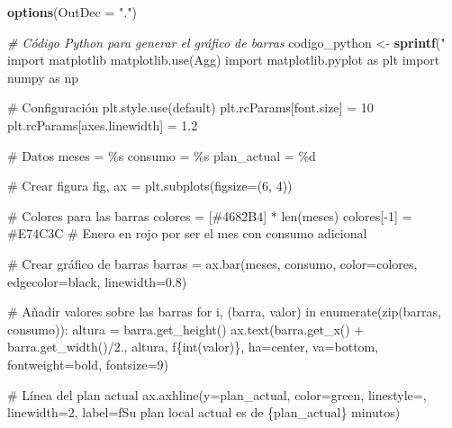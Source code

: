 \documentclass[
]{article}
\newenvironment{Shaded}{\begin{snugshade}}{\end{snugshade}}
\newcommand{\AttributeTok}[1]{\textcolor[rgb]{0.13,0.29,0.53}{#1}}
\newcommand{\CommentTok}[1]{\textcolor[rgb]{0.56,0.35,0.01}{\textit{#1}}}
\newcommand{\FunctionTok}[1]{\textcolor[rgb]{0.13,0.29,0.53}{\textbf{#1}}}
\newcommand{\NormalTok}[1]{#1}
\newcommand{\OtherTok}[1]{\textcolor[rgb]{0.56,0.35,0.01}{#1}}
\newcommand{\StringTok}[1]{\textcolor[rgb]{0.31,0.60,0.02}{#1}}
\begin{document}
\begin{Shaded}
\begin{Highlighting}[]
\FunctionTok{options}\NormalTok{(}\AttributeTok{OutDec =} \StringTok{"."}\NormalTok{)}

\CommentTok{\# Código Python para generar el gráfico de barras}
\NormalTok{codigo\_python }\OtherTok{\textless{}{-}} \FunctionTok{sprintf}\NormalTok{(}\StringTok{"}
\StringTok{import matplotlib}
\StringTok{matplotlib.use(\textquotesingle{}Agg\textquotesingle{})}
\StringTok{import matplotlib.pyplot as plt}
\StringTok{import numpy as np}

\StringTok{\# Configuración}
\StringTok{plt.style.use(\textquotesingle{}default\textquotesingle{})}
\StringTok{plt.rcParams[\textquotesingle{}font.size\textquotesingle{}] = 10}
\StringTok{plt.rcParams[\textquotesingle{}axes.linewidth\textquotesingle{}] = 1.2}

\StringTok{\# Datos}
\StringTok{meses = \%s}
\StringTok{consumo = \%s}
\StringTok{plan\_actual = \%d}

\StringTok{\# Crear figura}
\StringTok{fig, ax = plt.subplots(figsize=(6, 4))}

\StringTok{\# Colores para las barras}
\StringTok{colores = [\textquotesingle{}\#4682B4\textquotesingle{}] * len(meses)}
\StringTok{colores[{-}1] = \textquotesingle{}\#E74C3C\textquotesingle{}  \# Enero en rojo por ser el mes con consumo adicional}

\StringTok{\# Crear gráfico de barras}
\StringTok{barras = ax.bar(meses, consumo, color=colores, edgecolor=\textquotesingle{}black\textquotesingle{}, linewidth=0.8)}

\StringTok{\# Añadir valores sobre las barras}
\StringTok{for i, (barra, valor) in enumerate(zip(barras, consumo)):}
\StringTok{    altura = barra.get\_height()}
\StringTok{    ax.text(barra.get\_x() + barra.get\_width()/2., altura,}
\StringTok{            f\textquotesingle{}\{int(valor)\}\textquotesingle{},}
\StringTok{            ha=\textquotesingle{}center\textquotesingle{}, va=\textquotesingle{}bottom\textquotesingle{}, fontweight=\textquotesingle{}bold\textquotesingle{}, fontsize=9)}

\StringTok{\# Línea del plan actual}
\StringTok{ax.axhline(y=plan\_actual, color=\textquotesingle{}green\textquotesingle{}, linestyle=\textquotesingle{}{-}{-}\textquotesingle{}, linewidth=2,}
\StringTok{           label=f\textquotesingle{}Su plan local actual es de \{plan\_actual\} minutos\textquotesingle{})}


\end{Highlighting}
\end{Shaded}
\end{document}
